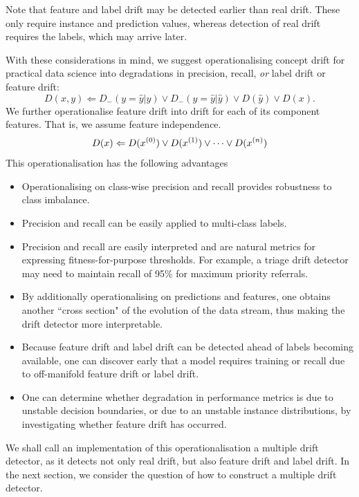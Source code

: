 Note that feature and label drift may be detected earlier than real drift. These only require instance and prediction values, whereas detection of real drift requires the labels, which may arrive later.

With these considerations in mind, we suggest operationalising concept drift for practical data science into degradations in precision, recall, {\it or} label drift or feature drift:
\begin{equation}
  D(x,y) \Leftarrow D_-(y=\hat{y}|y) \vee D_-(y=\hat{y}|\hat{y}) \vee D(\hat{y}) \vee D(x).
\end{equation}
We further operationalise feature drift into drift for each of its component features. That is, we assume feature independence.
\begin{equation}
  D(x) \Leftarrow D(x^{(0)}) \vee D(x^{(1)}) \vee \dots \vee D(x^{(n)})
\end{equation}
This operationalisation has the following advantages
\begin{itemize}
  \item Operationalising on class-wise precision and recall provides robustness to class imbalance.
  \item Precision and recall can be easily applied to multi-class labels.
  \item Precision and recall are easily interpreted and are natural metrics for expressing fitness-for-purpose thresholds. For example, a triage drift detector may need to maintain recall of 95\% for maximum priority referrals.
  \item By additionally operationalising on predictions and features, one obtains another ``cross section" of the evolution of the data stream, thus making the drift detector more interpretable.
  \item Because feature drift and label drift can be detected ahead of labels becoming available, one can discover early that a model requires training or recall due to off-manifold feature drift or label drift.
  \item One can determine whether degradation in performance metrics is due to unstable decision boundaries, or due to an unstable instance distributions, by investigating whether feature drift has occurred.
\end{itemize}

We shall call an implementation of this operationalisation a multiple drift detector, as it detects not only real drift, but also feature drift and label drift. In the next section, we consider the question of how to construct a multiple drift detector.

